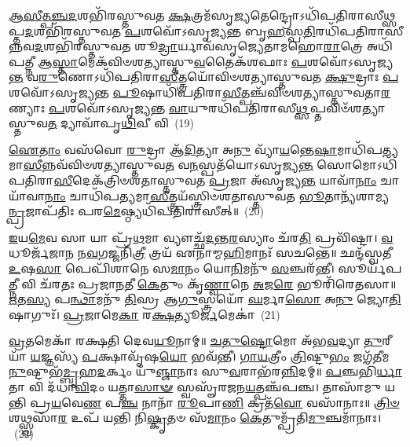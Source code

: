 \-\ul{𑌆}\-\-\ul{𑌸𑍀}\-\-\ul{𑌤𑍍𑌪}\-\-\ul{𑌞𑍍𑌚}\-\-\ul{𑌦}\-𑌶𑌭𑌿᳴𑌰𑌸𑍍𑌤𑍁𑌵𑌤 \ul{𑌕𑍍𑌷}\-𑌤𑍍𑌰𑌮᳴𑌸𑍃\-\ul{𑌜𑍍𑌯}\-𑌤𑍇𑌨𑍍𑌦𑍍𑌰𑍋\-𑌽𑌧𑌿᳴𑌪𑌤𑌿𑌰𑌾𑌸𑍀𑌥𑍍𑌸𑌪𑍍𑌤\-\ul{𑌦}\-𑌶𑌭𑌿᳴𑌰𑌸𑍍𑌤𑍁𑌵𑌤 \ul{𑌪}\-𑌶𑌵𑍋᳴\-𑌽𑌸𑍃𑌜𑍍𑌯\-\ul{𑌨𑍍𑌤} 𑌬𑍃\-\ul{𑌹}\-𑌸𑍍𑌪\-\ul{𑌤𑌿}\-𑌰𑌧𑌿᳴𑌪𑌤𑌿𑌰𑌾𑌸𑍀\-𑌨𑍍𑌨𑌵\-\ul{𑌦}\-𑌶𑌭𑌿᳴𑌰𑌸𑍍𑌤𑍁𑌵𑌤 𑌶𑍂\-\ul{𑌦𑍍𑌰𑌾}\-𑌰𑍍𑌯𑌾𑌵᳴𑌸𑍃𑌜𑍍𑌯𑍇𑌤𑌾𑌮𑌹𑍋\-\ul{𑌰𑌾}\-𑌤𑍍𑌰𑍇 𑌅𑌧𑌿᳴𑌪𑌤𑍍𑌨𑍀 𑌆\-\ul{𑌸𑍍𑌤𑌾}\-𑌮𑍇𑌕᳴𑌵𑌿𑍞𑌶𑌤𑍍𑌯𑌾𑌸𑍍𑌤𑍁\-\ul{𑌵}\-𑌤𑍈𑌕᳴𑌶𑌫𑌾𑌃 \ul{𑌪}\-𑌶𑌵𑍋᳴\-𑌽𑌸𑍃𑌜𑍍𑌯\-\ul{𑌨𑍍𑌤} 𑌵\-\ul{𑌰𑍁}\-𑌣𑍋\-𑌽𑌧𑌿᳴𑌪𑌤𑌿𑌰𑌾\-\ul{𑌸𑍀}\-𑌤𑍍𑌤𑍍𑌰𑌯𑍋᳴𑌵𑌿𑍞𑌶𑌤𑍍𑌯𑌾𑌸𑍍𑌤𑍁𑌵𑌤 \ul{𑌕𑍍𑌷𑍁}\-𑌦𑍍𑌰𑌾𑌃 \ul{𑌪}\-𑌶𑌵𑍋᳴\-𑌽𑌸𑍃𑌜𑍍𑌯𑌨𑍍𑌤 \ul{𑌪𑍂}\-𑌷𑌾𑌧𑌿᳴𑌪𑌤𑌿𑌰𑌾\-\ul{𑌸𑍀}\-𑌤𑍍𑌪𑌞𑍍𑌚᳴𑌵𑌿𑍞𑌶𑌤𑍍𑌯𑌾𑌸𑍍𑌤𑍁𑌵𑌤𑌾\-\ul{𑌰}\-𑌣𑍍𑌯𑌾𑌃 \ul{𑌪}\-𑌶𑌵𑍋᳴\-𑌽𑌸𑍃𑌜𑍍𑌯𑌨𑍍𑌤 \ul{𑌵𑌾}\-𑌯𑍁𑌰𑌧𑌿᳴𑌪𑌤𑌿𑌰𑌾𑌸𑍀\-\ul{𑌥𑍍𑌸}\-𑌪𑍍𑌤𑌵𑌿𑍞᳴𑌶𑌤𑍍𑌯𑌾𑌸𑍍𑌤𑍁𑌵\-\ul{𑌤} 𑌦𑍍𑌯𑌾𑌵𑌾᳴𑌪𑍃\-\ul{𑌥𑌿}\-𑌵𑍀 𑌵𑌿~(19)

\-\ul{𑌐}\-\-\ul{𑌤𑌾𑌂} 𑌵𑌸᳴𑌵𑍋 \ul{𑌰𑍁}\-𑌦𑍍𑌰𑌾 𑌆᳴\-\ul{𑌦𑌿}\-𑌤𑍍𑌯𑌾 𑌅\-\ul{𑌨𑍁} 𑌵𑍍𑌯𑌾᳴\-\ul{𑌯}\-𑌨𑍍𑌤𑍇\-\ul{𑌷𑌾}\-𑌮𑌾𑌧𑌿᳴𑌪𑌤𑍍𑌯𑌮𑌾\-\ul{𑌸𑍀}\-𑌨𑍍𑌨𑌵᳴𑌵𑌿𑍞𑌶𑌤𑍍𑌯𑌾𑌸𑍍𑌤𑍁𑌵\-\ul{𑌤} 𑌵\-\ul{𑌨}\-𑌸𑍍𑌪𑌤᳴𑌯𑍋\-𑌽𑌸𑍃𑌜𑍍𑌯\-\ul{𑌨𑍍𑌤} 𑌸𑍋𑌮𑍋\-𑌽\-𑌧𑌿᳴𑌪𑌤𑌿𑌰𑌾\-\ul{𑌸𑍀}\-𑌦𑍇𑌕᳴𑌤𑍍𑌰𑌿𑍞𑌶𑌤𑌾𑌸𑍍𑌤𑍁𑌵𑌤 \ul{𑌪𑍍𑌰}\-𑌜𑌾 𑌅᳴𑌸𑍃𑌜𑍍𑌯\-\ul{𑌨𑍍𑌤} 𑌯𑌾𑌵𑌾᳴\-\ul{𑌨𑌾𑌂} 𑌚𑌾𑌯𑌾᳴𑌵𑌾\-\ul{𑌨𑌾𑌂} 𑌚𑌾𑌧𑌿᳴𑌪𑌤𑍍𑌯𑌮𑌾\-\ul{𑌸𑍀}\-𑌤𑍍𑌤𑍍𑌰𑌯᳴𑌸𑍍𑌤𑍍𑌰𑌿𑍞𑌶𑌤𑌾𑌸𑍍𑌤𑍁𑌵𑌤 \ul{𑌭𑍂}\-𑌤𑌾𑌨𑍍𑌯᳴𑌶𑌾𑌮𑍍𑌯\-\ul{𑌨𑍍𑌪𑍍𑌰}\-𑌜𑌾𑌪᳴𑌤𑌿𑌃 𑌪𑌰\-\ul{𑌮𑍇}\-𑌷𑍍𑌠𑍍𑌯𑌧𑌿᳴𑌪𑌤𑌿𑌰𑌾𑌸𑍀𑌤𑍍॥~(20)

{\anuvakamend[{\-\ul{𑌸𑌂} \ul{𑌵}\-\-\ul{𑌥𑍍𑌸}\-𑌰𑍋\-𑌽𑌧𑌿᳴𑌪\-\ul{𑌤𑌿}\-𑌰𑍍𑌵𑌿 𑌪𑌞𑍍𑌚᳴𑌤𑍍𑌰𑌿𑍞𑌶𑌚𑍍𑌚}]}%

\-\ul{𑌇}\-𑌯\-\ul{𑌮𑍇}\-𑌵 𑌸𑌾 𑌯𑌾 𑌪𑍍𑌰᳴\-\ul{𑌥}\-𑌮𑌾 𑌵𑍍𑌯𑍗𑌚𑍍𑌛᳴\-\ul{𑌦}\-𑌨𑍍𑌤\-\ul{𑌰}\-𑌸𑍍𑌯𑌾𑌂 𑌚᳴𑌰\-\ul{𑌤𑌿} 𑌪𑍍𑌰𑌵𑌿᳴𑌷𑍍𑌟𑌾। \ul{𑌵}\-𑌧𑍂𑌰𑍍𑌜᳴𑌜𑌾𑌨 𑌨\-\ul{𑌵}\-𑌗𑌜𑍍𑌜𑌨𑌿᳴\-\ul{𑌤𑍍𑌰𑍀} 𑌤𑍍𑌰𑌯᳴ 𑌏𑌨𑌾𑌮𑍍𑌮\-\ul{𑌹𑌿}\-𑌮𑌾𑌨𑌃᳴ 𑌸𑌚𑌨𑍍𑌤𑍇॥ 𑌛𑌨𑍍𑌦᳴𑌸𑍍𑌵𑌤𑍀 \ul{𑌉}\-𑌷\-\ul{𑌸𑌾} 𑌪𑍇𑌪𑌿᳴𑌶𑌾𑌨𑍇 𑌸\-\ul{𑌮𑌾}\-𑌨𑌂 𑌯𑍋\-\ul{𑌨𑌿}\-𑌮𑌨𑍁᳴ \ul{𑌸}\-𑌞𑍍𑌚𑌰᳴𑌨𑍍𑌤𑍀। 𑌸𑍂𑌰𑍍𑌯᳴𑌪\-\ul{𑌤𑍍𑌨𑍀} 𑌵𑌿 𑌚᳴𑌰𑌤𑌃 𑌪𑍍𑌰𑌜𑌾\-\ul{𑌨}\-𑌤𑍀 \ul{𑌕𑍇}\-𑌤𑍁𑌂 𑌕𑍃᳴\-\ul{𑌣𑍍𑌵𑌾}\-𑌨𑍇 \ul{𑌅}\-𑌜\-\ul{𑌰𑍇} 𑌭𑍂𑌰𑌿᳴𑌰𑍇𑌤𑌸𑌾॥ \ul{𑌋}\-𑌤\-\ul{𑌸𑍍𑌯} 𑌪\-\ul{𑌨𑍍𑌥𑌾}\-𑌮𑌨𑍁᳴ \ul{𑌤𑌿}\-𑌸𑍍𑌰 𑌆\-\ul{𑌗𑍁}\-𑌸𑍍𑌤𑍍𑌰𑌯𑍋᳴ \ul{𑌘}\-𑌰𑍍𑌮𑌾\-\ul{𑌸𑍋} 𑌅\-\ul{𑌨𑍁} 𑌜𑍍𑌯𑍋\-\ul{𑌤𑌿}\-𑌷𑌾𑌗𑍁𑌃᳴। \ul{𑌪𑍍𑌰}\-𑌜𑌾𑌮𑍇\-\ul{𑌕𑌾} 𑌰\-\ul{𑌕𑍍𑌷}\-𑌤𑍍𑌯𑍂\-\ul{𑌰𑍍𑌜}\-𑌮𑍇𑌕𑌾॑~(21)

\-\ul{𑌵𑍍𑌰}\-𑌤𑌮𑍇𑌕𑌾᳴ 𑌰𑌕𑍍𑌷𑌤𑌿 𑌦𑍇𑌵\-\ul{𑌯𑍂}\-𑌨𑌾𑌮𑍍॥ \ul{𑌚}\-\-\ul{𑌤𑍁}\-\-\ul{𑌷𑍍𑌟𑍋}\-𑌮𑍋 𑌅᳴𑌭\-\ul{𑌵}\-𑌦𑍍𑌯𑌾 \ul{𑌤𑍁}\-𑌰𑍀𑌯𑌾᳴ \ul{𑌯}\-𑌜𑍍𑌞𑌸𑍍𑌯᳴ \ul{𑌪}\-𑌕𑍍𑌷𑌾𑌵𑍃᳴𑌷\-\ul{𑌯𑍋} 𑌭𑌵᳴𑌨𑍍𑌤𑍀। \ul{𑌗𑌾}\-\-\ul{𑌯}\-𑌤𑍍𑌰𑍀𑌂 \ul{𑌤𑍍𑌰𑌿}\-𑌷𑍍𑌟𑍁\-\ul{𑌭𑌂} 𑌜𑌗᳴𑌤𑍀𑌮\-\ul{𑌨𑍁}\-𑌷𑍍𑌟𑍁𑌭᳴\-\ul{𑌮𑍍𑌬𑍃}\-𑌹\-\ul{𑌦}\-𑌰𑍍𑌕𑌂 𑌯𑍁᳴\-\ul{𑌞𑍍𑌜𑌾}\-𑌨𑌾𑌃 𑌸𑍁\-\ul{𑌵}\-𑌰𑌾𑌭᳴𑌰\-\ul{𑌨𑍍𑌨𑌿}\-𑌦𑌮𑍍॥ \ul{𑌪}\-𑌞𑍍𑌚𑌭𑌿᳴\-\ul{𑌰𑍍𑌧𑌾}\-𑌤𑌾 𑌵𑌿 𑌦᳴𑌧𑌾\-\ul{𑌵𑌿}\-𑌦𑌂 𑌯𑌤𑍍𑌤𑌾\-\ul{𑌸𑌾}\-\-\ul{𑍟} 𑌸𑍍𑌵𑌸𑍄᳴𑌰𑌜𑌨\-\ul{𑌯}\-𑌤𑍍𑌪𑌞𑍍𑌚᳴𑌪𑌞𑍍𑌚। 𑌤𑌾𑌸𑌾᳴𑌮𑍁 𑌯𑌨𑍍𑌤𑌿 𑌪𑍍𑌰\-\ul{𑌯}\-𑌵𑍇\-\ul{𑌣} 𑌪\-\ul{𑌞𑍍𑌚} 𑌨𑌾𑌨𑌾᳴ \ul{𑌰𑍂}\-𑌪𑌾\-\ul{𑌣𑌿} 𑌕𑍍𑌰𑌤᳴\-\ul{𑌵𑍋} 𑌵𑌸𑌾᳴𑌨𑌾𑌃॥ \ul{𑌤𑍍𑌰𑌿}\-\-\ul{𑍞}\-𑌶𑌥𑍍𑌸𑍍𑌵𑌸𑌾᳴\-\ul{𑌰} 𑌉𑌪᳴ 𑌯𑌨𑍍𑌤𑌿 𑌨𑌿\-\ul{𑌷𑍍𑌕𑍃}\-𑌤𑍞 𑌸᳴\-\ul{𑌮𑌾}\-𑌨𑌂 \ul{𑌕𑍇}\-𑌤𑍁𑌮𑍍𑌪𑍍𑌰᳴𑌤𑌿\-\ul{𑌮𑍁}\-𑌞𑍍𑌚𑌮𑌾᳴𑌨𑌾𑌃।~(22)


